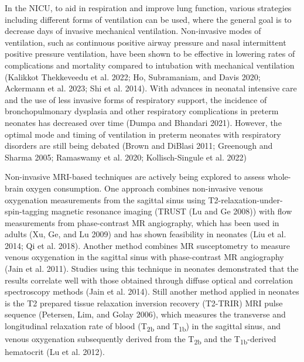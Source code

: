 \documentclass[
  letterpaper,
  DIV=11,
  numbers=noendperiod]{scrartcl}
\begin{document}
In the NICU, to aid in respiration and improve lung function, various
strategies including different forms of ventilation can be used, where
the general goal is to decrease days of invasive mechanical ventilation.
Non-invasive modes of ventilation, such as continuous positive airway
pressure and nasal intermittent positive pressure ventilation, have been
shown to be effective in lowering rates of complications and mortality
compared to intubation with mechanical ventilation (Kalikkot Thekkeveedu
et al. 2022; Ho, Subramaniam, and Davis 2020; Ackermann et al. 2023; Shi
et al. 2014). With advances in neonatal intensive care and the use of
less invasive forms of respiratory support, the incidence of
bronchopulmonary dysplasia and other respiratory complications in
preterm neonates has decreased over time (Dumpa and Bhandari 2021).
However, the optimal mode and timing of ventilation in preterm neonates
with respiratory disorders are still being debated (Brown and DiBlasi
2011; Greenough and Sharma 2005; Ramaswamy et al. 2020; Kollisch-Singule
et al. 2022)

Non-invasive MRI-based techniques are actively being explored to assess
whole-brain oxygen consumption. One approach combines non-invasive
venous oxygenation measurements from the sagittal sinus using
T2-relaxation-under-spin-tagging magnetic resonance imaging (TRUST (Lu
and Ge 2008)) with flow measurements from phase-contrast MR angiography,
which has been used in adults (Xu, Ge, and Lu 2009) and has shown
feasibility in neonates (Liu et al. 2014; Qi et al. 2018). Another
method combines MR susceptometry to measure venous oxygenation in the
sagittal sinus with phase-contrast MR angiography (Jain et al. 2011).
Studies using this technique in neonates demonstrated that the results
correlate well with those obtained through diffuse optical and
correlation spectroscopy methods (Jain et al. 2014). Still another
method applied in neonates is the T2 prepared tissue relaxation
inversion recovery (T2-TRIR) MRI pulse sequence (Petersen, Lim, and
Golay 2006), which measures the transverse and longitudinal relaxation
rate of blood (T\textsubscript{2b} and T\textsubscript{1b}) in the
sagittal sinus, and venous oxygenation subsequently derived from the
T\textsubscript{2b} and the T\textsubscript{1b}-derived hematocrit (Lu
et al. 2012).
\end{document}
